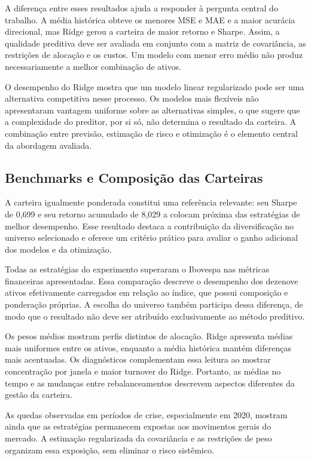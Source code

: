 \documentclass[12pt,a4paper]{article}
\begin{document}
A diferença entre esses resultados ajuda a responder à pergunta central do trabalho. A média histórica obteve os menores MSE e MAE e a maior acurácia direcional, mas Ridge gerou a carteira de maior retorno e Sharpe. Assim, a qualidade preditiva deve ser avaliada em conjunto com a matriz de covariância, as restrições de alocação e os custos. Um modelo com menor erro médio não produz necessariamente a melhor combinação de ativos.

O desempenho do Ridge mostra que um modelo linear regularizado pode ser uma alternativa competitiva nesse processo. Os modelos mais flexíveis não apresentaram vantagem uniforme sobre as alternativas simples, o que sugere que a complexidade do preditor, por si só, não determina o resultado da carteira. A combinação entre previsão, estimação de risco e otimização é o elemento central da abordagem avaliada.

\subsection{Benchmarks e Composição das Carteiras}

A carteira igualmente ponderada constitui uma referência relevante: seu Sharpe de 0,699 e seu retorno acumulado de 8,029 a colocam próxima das estratégias de melhor desempenho. Esse resultado destaca a contribuição da diversificação no universo selecionado e oferece um critério prático para avaliar o ganho adicional dos modelos e da otimização.

Todas as estratégias do experimento superaram o Ibovespa nas métricas financeiras apresentadas. Essa comparação descreve o desempenho dos dezenove ativos efetivamente carregados em relação ao índice, que possui composição e ponderação próprias. A escolha do universo também participa dessa diferença, de modo que o resultado não deve ser atribuído exclusivamente ao método preditivo.

Os pesos médios mostram perfis distintos de alocação. Ridge apresenta médias mais uniformes entre os ativos, enquanto a média histórica mantém diferenças mais acentuadas. Os diagnósticos complementam essa leitura ao mostrar concentração por janela e maior turnover do Ridge. Portanto, as médias no tempo e as mudanças entre rebalanceamentos descrevem aspectos diferentes da gestão da carteira.

As quedas observadas em períodos de crise, especialmente em 2020, mostram ainda que as estratégias permanecem expostas aos movimentos gerais do mercado. A estimação regularizada da covariância e as restrições de peso organizam essa exposição, sem eliminar o risco sistêmico.
\end{document}
